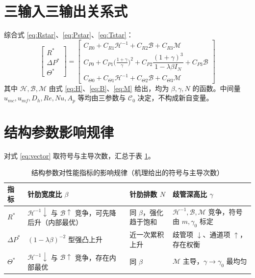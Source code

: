 \documentclass[UTF8,a4paper,12pt]{ctexart}
\numberwithin{equation}{section}
\begin{document}
\section{三输入三输出关系式}

综合式 \eqref{eq:Rstar}、\eqref{eq:Pstar}、\eqref{eq:Tstar}：
\begin{equation}
    \boxed{\;
    \begin{bmatrix}R^*\\[4pt]\Delta P^*\\[4pt]\Theta^*\end{bmatrix}
    =
    \begin{bmatrix}
    C_{R0}+C_{R1}\mathcal H^{-1}+C_{R2}\mathcal B+C_{R3}\mathcal M\\[6pt]
    C_{P0}+C_{P1}\big(\tfrac{1+\gamma}{\gamma}\big)^2+C_{P2}\dfrac{(1+\gamma)^3}{1-\lambda\beta I_N}+C_{P3}\mathcal B\\[10pt]
    C_{\Theta0}+C_{\Theta1}\mathcal H^{-1}+C_{\Theta2}\mathcal B+C_{\Theta3}\mathcal M
    \end{bmatrix}
    \;}
    \label{eq:vector}
\end{equation}
其中 $\mathcal H,\mathcal B,\mathcal M$ 由式 \eqref{eq:H}、\eqref{eq:B}、\eqref{eq:M} 给出，均为 $\beta,\gamma,N$ 的函数。中间量 $u_{mc},u_{mf},D_h,Re,Nu,A_p$ 等均由三参数与 $\mathcal C_0$ 决定，不构成新自变量。

\section{结构参数影响规律}

对式 \eqref{eq:vector} 取符号与主导次数，汇总于表 \ref{tab:law}。

\begin{table}[htbp]
\centering
\caption{结构参数对性能指标的影响规律（机理给出的符号与主导次数）}
\label{tab:law}
\begin{tabular}{p{1.6cm} p{3.6cm} p{3.4cm} p{4.0cm}}
\toprule
指标 & 针肋宽度比 $\beta$ & 针肋排数 $N$ & 歧管深高比 $\gamma$ \\
\midrule
$R^*$
& $\mathcal H^{-1}\!\downarrow$ 与 $\mathcal B\!\uparrow$ 竞争，可先降后升（内部最优）
& 同 $\beta$，强化趋于饱和
& $\mathcal H^{-1},\mathcal B,\mathcal M$ 竞争，符号由 $m,\gamma_0$ 标定 \\
$\Delta P^*$
& $(1-\lambda\beta)^{-2}$ 型强凸上升
& 近一次累积上升
& 歧管项 $\downarrow$、通道项 $\uparrow$，存在权衡 \\
$\Theta^*$
& $\mathcal H^{-1}\!\downarrow$ 与 $\mathcal B\!\uparrow$ 竞争，存在内部最优
& 同 $\beta$
& $\mathcal M$ 主导，$\gamma\to\gamma_0$ 最均匀 \\
\bottomrule
\end{tabular}
\end{table}
\end{document}
